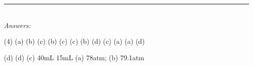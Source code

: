 \documentclass[main.tex]{subfiles}
\begin{document}
\begin{fullwidth}
\begin{multicols}{2}
\begin{enumerate}[resume]




 \end{enumerate}
\end{multicols}
\end{fullwidth}
\begin{fullwidth}
\par\noindent\rule{0.5\textwidth}{0.4pt}\\
\emph{Answers:}\\
\vspace{-0.5cm}
\begin{tasks}[counter-format={tsk[1].}, label-align=left, label-offset={0mm}, label-width={5mm}, item-indent={1mm}, label-format={\bfseries}](4)
\task (a) 
\task (b) 
\task (c) 
\task (b)
\task (c)
\task (c)
\task (b) 
\task (d) 
\task (c) 
\task (a) 
\task (a) 
\task (d) 

\task (d) 
\task (d) 
\task (c)
\task 40mL
\task 15mL
 \task \small {}
\task (a) 78atm; (b) 79.1atm

\end{tasks}






\end{fullwidth}
\restoregeometry
\end{document}
